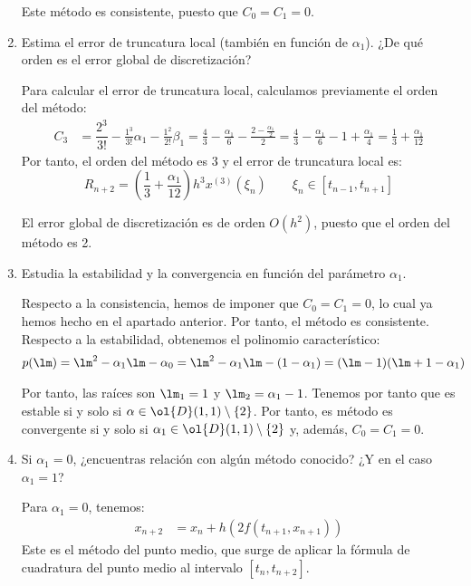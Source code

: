 \begin{ejercicio}
\begin{enumerate}
        Este método es consistente, puesto que $C_0=C_1=0$.
        \item Estima el error de truncatura local (también en función de $\alpha_1$). ¿De qué orden es el error global de discretización?
        
        Para calcular el error de truncatura local, calculamos previamente el orden del método:
        \begin{align*}
            C_3 &= \dfrac{2^3}{3!} - \frac{1^3}{3!}\alpha_1 - \frac{1^2}{2!}\beta_1 = \frac{4}{3} - \frac{\alpha_1}{6} - \frac{2 - \frac{\alpha_1}{2}}{2} = \frac{4}{3} - \frac{\alpha_1}{6} - 1 + \frac{\alpha_1}{4}
            = \frac{1}{3} + \frac{\alpha_1}{12}
        \end{align*}
        Por tanto, el orden del método es 3 y el error de truncatura local es:
        \begin{equation*}
            R_{n+2} = \left(\frac{1}{3} + \frac{\alpha_1}{12}\right)h^3x^{(3)}(\xi_n) \qquad \xi_n \in [t_{n-1},t_{n+1}]
        \end{equation*}

        El error global de discretización es de orden $O(h^2)$, puesto que el orden del método es 2.
        \item Estudia la estabilidad y la convergencia en función del parámetro $\alpha_1$.
        
        Respecto a la consistencia, hemos de imponer que $C_0=C_1=0$, lo cual ya hemos hecho en el apartado anterior. Por tanto, el método es consistente.
        Respecto a la estabilidad, obtenemos el polinomio característico:
        \begin{align*}
            p(\lm) &= \lm^2 - \alpha_1\lm - \alpha_0
            = \lm^2 - \alpha_1\lm - (1 - \alpha_1) = (\lm - 1)(\lm + 1-\alpha_1)
        \end{align*}

        Por tanto, las raíces son $\lm_1 = 1$ y $\lm_2 = \alpha_1 - 1$. Tenemos por tanto que es estable si y solo si $\alpha\in \ol{D}(1,1)\setminus \{2\}$. Por tanto, es método es convergente si y solo si $\alpha_1 \in \ol{D}(1,1)\setminus \{2\}$ y, además, $C_0=C_1=0$.

        \item Si $\alpha_1 = 0$, ¿encuentras relación con algún método conocido? ¿Y en el caso $\alpha_1 = 1$?
        
        Para $\alpha_1 = 0$, tenemos:
        \begin{align*}
            x_{n+2} &= x_n + h \left( 2 f(t_{n+1}, x_{n+1})\right)
        \end{align*}
        Este es el método del punto medio, que surge de aplicar la fórmula de cuadratura del punto medio al intervalo $[t_n, t_{n+2}]$.


\end{enumerate}
\end{ejercicio}
